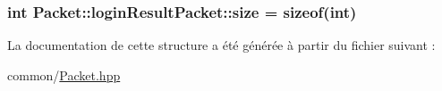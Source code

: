 \subsubsection[{size}]{\setlength{\rightskip}{0pt plus 5cm}int Packet\+::login\+Result\+Packet\+::size = sizeof(int)}\label{structPacket_1_1loginResultPacket_a270afae616b7a7399c2d4c483fcffec6}


La documentation de cette structure a été générée à partir du fichier suivant \+:\begin{DoxyCompactItemize}
\item 
common/\hyperlink{Packet_8hpp}{Packet.\+hpp}\end{DoxyCompactItemize}
